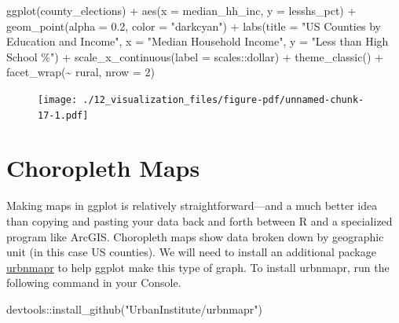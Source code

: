 \documentclass[
  letterpaper,
]{book}
\newenvironment{Shaded}{\begin{snugshade}}{\end{snugshade}}
\newcommand{\AttributeTok}[1]{\textcolor[rgb]{0.40,0.45,0.13}{#1}}
\newcommand{\DecValTok}[1]{\textcolor[rgb]{0.68,0.00,0.00}{#1}}
\newcommand{\FloatTok}[1]{\textcolor[rgb]{0.68,0.00,0.00}{#1}}
\newcommand{\FunctionTok}[1]{\textcolor[rgb]{0.28,0.35,0.67}{#1}}
\newcommand{\NormalTok}[1]{\textcolor[rgb]{0.00,0.23,0.31}{#1}}
\newcommand{\SpecialCharTok}[1]{\textcolor[rgb]{0.37,0.37,0.37}{#1}}
\newcommand{\StringTok}[1]{\textcolor[rgb]{0.13,0.47,0.30}{#1}}
\theoremstyle{definition}
\theoremstyle{definition}
\theoremstyle{plain}
\theoremstyle{definition}
\theoremstyle{plain}
\theoremstyle{plain}
\theoremstyle{remark}
\begin{document}
\begin{Shaded}
\begin{Highlighting}[]
\FunctionTok{ggplot}\NormalTok{(county\_elections) }\SpecialCharTok{+}
  \FunctionTok{aes}\NormalTok{(}\AttributeTok{x =}\NormalTok{ median\_hh\_inc, }\AttributeTok{y =}\NormalTok{ lesshs\_pct) }\SpecialCharTok{+}
  \FunctionTok{geom\_point}\NormalTok{(}\AttributeTok{alpha =} \FloatTok{0.2}\NormalTok{, }\AttributeTok{color =} \StringTok{"darkcyan"}\NormalTok{) }\SpecialCharTok{+}
  \FunctionTok{labs}\NormalTok{(}\AttributeTok{title =} \StringTok{"US Counties by Education and Income"}\NormalTok{,}
       \AttributeTok{x =} \StringTok{"Median Household Income"}\NormalTok{,}
       \AttributeTok{y =} \StringTok{"Less than High School \%"}\NormalTok{) }\SpecialCharTok{+}
  \FunctionTok{scale\_x\_continuous}\NormalTok{(}\AttributeTok{label =}\NormalTok{ scales}\SpecialCharTok{::}\NormalTok{dollar) }\SpecialCharTok{+}
  \FunctionTok{theme\_classic}\NormalTok{() }\SpecialCharTok{+}
  \FunctionTok{facet\_wrap}\NormalTok{(}\SpecialCharTok{\textasciitilde{}}\NormalTok{ rural, }\AttributeTok{nrow =} \DecValTok{2}\NormalTok{)}
\end{Highlighting}
\end{Shaded}

\begin{figure}[H]

{\centering \texttt{[image: ./12\_visualization\_files/figure-pdf/unnamed-chunk-17-1.pdf]}

}

\end{figure}

\hypertarget{choropleth-maps}{%
\section{Choropleth Maps}\label{choropleth-maps}}

Making maps in ggplot is relatively straightforward---and a much better
idea than copying and pasting your data back and forth between R and a
specialized program like ArcGIS. Choropleth maps show data broken down
by geographic unit (in this case US counties). We will need to install
an additional package
\href{https://urban-institute.medium.com/how-to-create-state-and-county-maps-easily-in-r-577d29300bb2}{urbnmapr}
to help ggplot make this type of graph. To install urbnmapr, run the
following command in your Console.

\begin{Shaded}
\begin{Highlighting}[]
\NormalTok{devtools}\SpecialCharTok{::}\FunctionTok{install\_github}\NormalTok{(}\StringTok{"UrbanInstitute/urbnmapr"}\NormalTok{)}
\end{Highlighting}
\end{Shaded}
\end{document}
